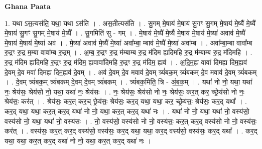 \documentclass[17pt]{extarticle}
\begin{document}
\textbf{Ghana Paata } \newline

1. यथा ऽस॒त्यस॑ति॒ यथा॒ यथा ऽस॑ति । . अस॒तीत्यस॑ति । . सु॒गम् मे॒षाय॑ मे॒षाय॑ सु॒गꣳ सु॒गम् मे॒षाय॑ मे॒ष्यै॑ मे॒ष्यै॑ मे॒षाय॑ सु॒गꣳ सु॒गम् मे॒षाय॑ मे॒ष्यै᳚ । . सु॒गमिति॑ सु - गम् । . मे॒षाय॑ मे॒ष्यै॑ मे॒ष्यै॑ मे॒षाय॑ मे॒षाय॑ मे॒ष्या॑ अवाव॑ मे॒ष्यै॑ मे॒षाय॑ मे॒षाय॑ मे॒ष्या॑ अव॑ । . मे॒ष्या॑ अवाव॑ मे॒ष्यै॑ मे॒ष्या॑ अवा᳚म्बा॒ म्बाव॑ मे॒ष्यै॑ मे॒ष्या॑ अवा᳚म्ब । . अवा᳚म्बा॒म्बा वावा᳚म्ब रु॒द्रꣳ रु॒द्र म॒म्बा वावा᳚म्ब रु॒द्रम् । . अ॒म्ब॒ रु॒द्रꣳ रु॒द्र म॑म्बाम्ब रु॒द्र म॑दिम ह्यदिमहि रु॒द्र म॑म्बाम्ब रु॒द्र म॑दिमहि । . रु॒द्र म॑दिम ह्यदिमहि रु॒द्रꣳ रु॒द्र म॑दिम॒ ह्यवावा॑दिमहि रु॒द्रꣳ रु॒द्र म॑दिम॒ ह्यव॑ । . अ॒दि॒म॒ह्य वावा॑ दिमह्य दिम॒ह्यव॑ दे॒वम् दे॒व मवा॑ दिमह्य दिम॒ह्यव॑ दे॒वम् । . अव॑ दे॒वम् दे॒व मवाव॑ दे॒वम् त्र्यं॑बक॒म् त्र्यं॑बकम् दे॒व मवाव॑ दे॒वम् त्र्यं॑बकम् । . दे॒वम् त्र्यं॑बक॒म् त्र्यं॑बकम् दे॒वम् दे॒वम् त्र्यं॑बकम् । . त्र्यं॑बक॒मिति॒ त्रि - अं॒ब॒क॒म् । . यथा॑ नो नो॒ यथा॒ यथा॑ नः॒ श्रेय॑सः॒ श्रेय॑सो नो॒ यथा॒ यथा॑ नः॒ श्रेय॑सः । . नः॒ श्रेय॑सः॒ श्रेय॑सो नो नः॒ श्रेय॑सः॒ कर॒त् कर॒ च्छ्रेय॑सो नो नः॒ श्रेय॑सः॒ कर॑त् । . श्रेय॑सः॒ कर॒त् कर॒च् छ्रेय॑सः॒ श्रेय॑सः॒ कर॒द् यथा॒ यथा॒ कर॒ च्छ्रेय॑सः॒ श्रेय॑सः॒ कर॒द् यथा᳚ । . कर॒द् यथा॒ यथा॒ कर॒त् कर॒द् यथा॑ नो नो॒ यथा॒ कर॒त् कर॒द् यथा॑ नः । . यथा॑ नो नो॒ यथा॒ यथा॑ नो॒ वस्य॑सो॒ वस्य॑सो नो॒ यथा॒ यथा॑ नो॒ वस्य॑सः । . नो॒ वस्य॑सो॒ वस्य॑सो नो नो॒ वस्य॑सः॒ कर॒त् कर॒द् वस्य॑सो नो नो॒ वस्य॑सः॒ कर॑त् । . वस्य॑सः॒ कर॒त् कर॒द् वस्य॑सो॒ वस्य॑सः॒ कर॒द् यथा॒ यथा॒ कर॒द् वस्य॑सो॒ वस्य॑सः॒ कर॒द् यथा᳚ । . कर॒द् यथा॒ यथा॒ कर॒त् कर॒द् यथा॑ नो नो॒ यथा॒ कर॒त् कर॒द् यथा॑ नः । \newline
\end{document}
